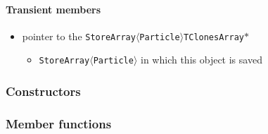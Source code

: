 \paragraph{Transient members}

\begin{itemize}
 \item {\color{blue} pointer to the {\tt StoreArray$\langle$Particle$\rangle$}}\hfill{\tt TClonesArray$\ast$}
 \begin{itemize}
  \item  {\tt StoreArray$\langle$Particle$\rangle$} in which this \particle object is saved
 \end{itemize}
\end{itemize}

\subsubsection{Constructors}



\subsubsection{Member functions}